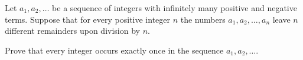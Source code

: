 Let $a_1,a_2,\ldots$ be a sequence of integers with infinitely many positive and negative terms. Suppose that for every positive integer $n$ the numbers $a_1,a_2,\ldots,a_n$ leave $n$ different remainders upon division by $n$.

Prove that every integer occurs exactly once in the sequence $a_1,a_2,\ldots$.